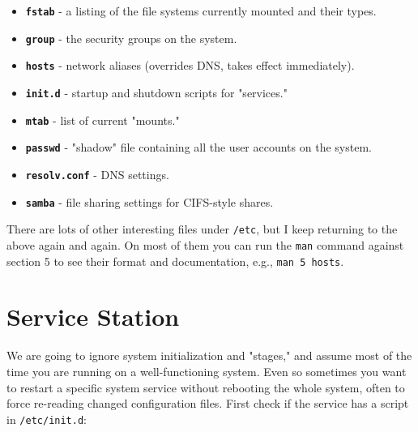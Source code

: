 \documentclass[10pt,american,]{book}
\numberwithin{figure}{chapter}
\begin{document}
\begin{itemize}
\item
  \textbf{\texttt{fstab}} - a listing of the file systems currently
  mounted and their types.
\item
  \textbf{\texttt{group}} - the security groups on the system.
\item
  \textbf{\texttt{hosts}} - network aliases (overrides DNS, takes effect
  immediately).
\item
  \textbf{\texttt{init.d}} - startup and shutdown scripts for
  "services."
\item
  \textbf{\texttt{mtab}} - list of current "mounts."
\item
  \textbf{\texttt{passwd}} - "shadow" file containing all the user
  accounts on the system.
\item
  \textbf{\texttt{resolv.conf}} - DNS settings.
\item
  \textbf{\texttt{samba}} - file sharing settings for CIFS-style shares.
\end{itemize}

There are lots of other interesting files under \texttt{/etc}, but I
keep returning to the above again and again. On most of them you can run
the \texttt{man} command against section 5 to see their format and
documentation, e.g., \texttt{man\ 5\ hosts}.

\section*{Service Station}\label{service-station}

We are going to ignore system initialization and "stages," and assume
most of the time you are running on a well-functioning system. Even so
sometimes you want to restart a specific system service without
rebooting the whole system, often to force re-reading changed
configuration files. First check if the service has a script in
\texttt{/etc/init.d}:
\end{document}
